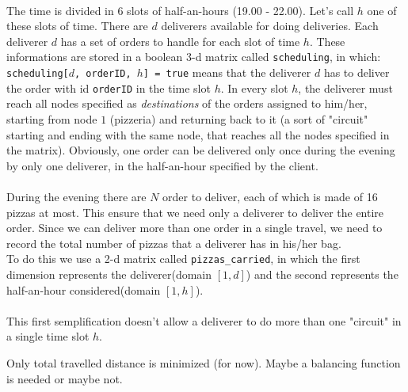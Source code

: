 \documentclass[10pt]{article}
\begin{document}
    \paragraph*{}
	The time is divided in 6 slots of half-an-hours (19.00 - 22.00). Let's call
	$h$ one of these slots of time.
	There are $d$ deliverers available for doing deliveries.
	Each deliverer $d$ has a set of orders to handle for each slot of time $h$.
	These informations are stored in a boolean 3-d matrix called 
	\texttt{scheduling}, in which: \texttt{scheduling[$d$, orderID, $h$] = true}
	means that the deliverer $d$ has to deliver the order with id 
	\texttt{orderID} in the time slot $h$. In every slot $h$, the deliverer must 
	reach all nodes specified as \textit{destinations} of the orders assigned to 
	him/her, starting from node $1$ (pizzeria) and returning back to it (a sort
	of "circuit" starting and ending with the same node, that reaches all the 
	nodes specified in the matrix).
	Obviously, one order can be delivered only once during the evening by only
	one deliverer, in the half-an-hour specified by the client.

	\paragraph*{}
	During the evening there are $N$ order to deliver, each of which is made of
	16 pizzas at most. This ensure that we need only a deliverer to deliver the 
	entire order.
	Since we can deliver more than one order in a single travel, we need to
	record the total number of pizzas that a deliverer has in his/her bag.\\
	To do this we use a 2-d matrix called \texttt{pizzas\_carried}, in which 
	the first dimension represents the deliverer(domain $[1,d]$) and the second 
	represents the half-an-hour considered(domain $[1,h]$).

	\paragraph*{}




	This first semplification doesn't allow a deliverer to do more than one
	"circuit" in a single time slot $h$. 




	Only total travelled distance is minimized (for now). Maybe a balancing 
	function is needed or maybe not.
\end{document}
